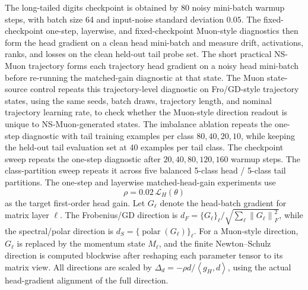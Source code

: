 \documentclass{article}
\theoremstyle{definition}
\newcommand{\Loss}{\mathcal L}
\newcommand{\norm}[1]{\left\lVert #1 \right\rVert}
\newcommand{\inner}[2]{\left\langle #1,#2 \right\rangle}
\newcommand{\polar}{\operatorname{polar}}
\begin{document}
The long-tailed digits checkpoint is obtained by 80 noisy mini-batch warmup steps, with batch size 64 and input-noise standard deviation \(0.05\). The fixed-checkpoint one-step, layerwise, and fixed-checkpoint Muon-style diagnostics then form the head gradient on a clean head mini-batch and measure drift, activations, ranks, and losses on the clean held-out tail probe set. The short practical NS-Muon trajectory forms each trajectory head gradient on a noisy head mini-batch before re-running the matched-gain diagnostic at that state. The Muon state-source control repeats this trajectory-level diagnostic on Fro/GD-style trajectory states, using the same seeds, batch draws, trajectory length, and nominal trajectory learning rate, to check whether the Muon-style direction readout is unique to NS-Muon-generated states. The imbalance ablation repeats the one-step diagnostic with tail training examples per class \(80,40,20,10\), while keeping the held-out tail evaluation set at 40 examples per tail class. The checkpoint sweep repeats the one-step diagnostic after \(20,40,80,120,160\) warmup steps. The class-partition sweep repeats it across five balanced 5-class head / 5-class tail partitions. The one-step and layerwise matched-head-gain experiments use
\[
\rho=0.02\,\Loss_H(\theta)
\]
as the target first-order head gain. Let \(G_\ell\) denote the head-batch gradient for matrix layer \(\ell\). The Frobenius/GD direction is \(d_F=\{G_\ell\}_\ell/\sqrt{\sum_\ell\norm{G_\ell}_F^2}\), while the spectral/polar direction is \(d_S=\{\polar(G_\ell)\}_\ell\). For a Muon-style direction, \(G_\ell\) is replaced by the momentum state \(M_\ell\), and the finite Newton--Schulz direction is computed blockwise after reshaping each parameter tensor to its matrix view. All directions are scaled by \(\Delta_d=-\rho d/\inner{g_H}{d}\), using the actual head-gradient alignment of the full direction.
\end{document}
